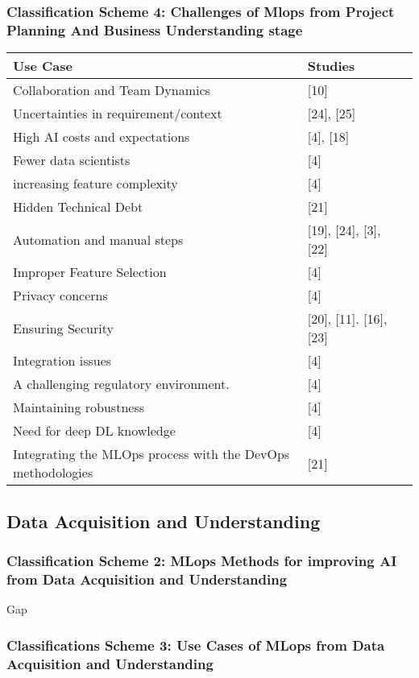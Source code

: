 \subsubsection{Classification Scheme 4: Challenges of Mlops from Project Planning And Business Understanding stage}

\begin{tabular}{|p{6cm}|p{6cm}|p{3cm}|}
  Use Case & Studies &\\
  \hline
  Collaboration and Team Dynamics & [10]\\
  \hline
  Uncertainties in requirement/context & [24], [25]\\
  \hline
  High AI costs and expectations & [4], [18]\\
  \hline
  Fewer data scientists & [4]\\
  \hline
  increasing feature complexity & [4]\\
  \hline
  Hidden Technical Debt & [21]\\
  \hline
  Automation and manual steps & [19], [24], [3], [22]\\
  \hline
  Improper Feature Selection & [4]\\
  \hline
  Privacy concerns & [4]\\
  \hline
  Ensuring Security & [20], [11]. [16], [23]\\
  \hline
  Integration issues & [4]\\
  \hline
  A challenging regulatory environment. & [4]\\
  \hline
  Maintaining robustness & [4]\\
  \hline
  Need for deep DL knowledge & [4]\\
  \hline
  Integrating the MLOps process with the DevOps methodologies & [21]\\
  \hline
\end{tabular}

\subsection{Data Acquisition and Understanding}
\subsubsection{Classification Scheme 2: MLops Methods  for improving AI from Data Acquisition and Understanding}

Gap

\subsubsection{Classifications Scheme 3: Use Cases of MLops from Data Acquisition and Understanding}

